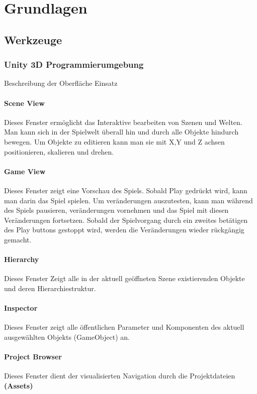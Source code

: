 \chapter{Grundlagen}

\section{Werkzeuge}

\subsection{Unity 3D Programmierumgebung}
Beschreibung der Oberfläche Einsatz

\subsubsection{Scene View}
Dieses Fenster ermöglicht das Interaktive bearbeiten von Szenen und Welten.
Man kann sich in der Spielwelt überall hin und durch alle Objekte hindurch bewegen. Um Objekte zu editieren kann man sie mit X,Y und Z achsen positionieren,
skalieren und drehen.

\subsubsection{Game View}
Dieses Fenster zeigt eine Vorschau des Spiels.
Sobald Play gedrückt wird, kann man darin das Spiel spielen.
Um veränderungen auszutesten, kann man während des Spiels pausieren, veränderungen vornehmen und das Spiel mit diesen Veränderungen fortsetzen. Sobald der Spielvorgang durch ein zweites betätigen des Play buttons gestoppt wird, werden die Veränderungen wieder rückgängig gemacht.

\subsubsection{Hierarchy}
Dieses Fenster Zeigt alle in der aktuell geöffneten Szene existierenden Objekte und deren Hierarchiestruktur.

\subsubsection{Inspector}
Dieses Fenster zeigt alle öffentlichen Parameter und Komponenten des aktuell ausgewählten Objekts (GameObject) an.

\subsubsection{Project Browser}
Dieses Fenster dient der visualisierten Navigation durch die Projektdateien \textbf{(Assets)}

